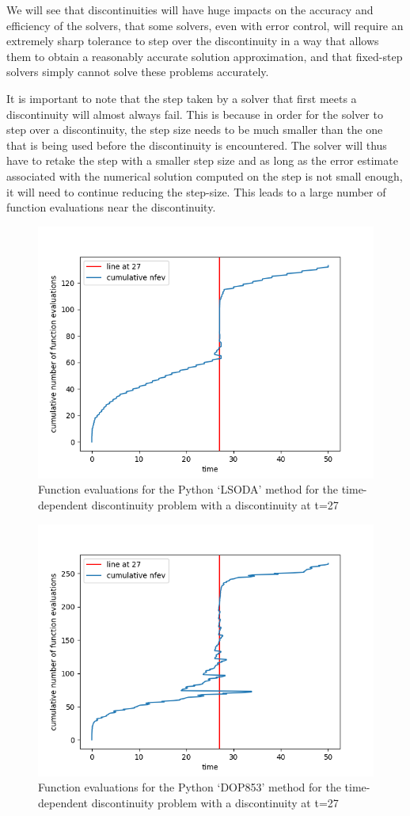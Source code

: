 We will see that discontinuities will have huge impacts on the accuracy and efficiency of the solvers, that some solvers, even with error control, will require an extremely sharp tolerance to step over the discontinuity in a way that allows them to obtain a reasonably accurate solution approximation, and that fixed-step solvers simply cannot solve these problems accurately. 

It is important to note that the step taken by a solver that first meets a discontinuity will almost always fail. This is because in order for the solver to step over a discontinuity, the step size needs to be much smaller than the one that is being used before the discontinuity is encountered. The solver will thus have to retake the step with a smaller step size and as long as the error estimate associated with the numerical solution computed on the step is not small enough, it will need to continue reducing the step-size. This leads to a large number of function evaluations near the discontinuity. 

\begin{figure}[h]
\centering
\includegraphics[width=0.7\linewidth]{./figures/lsoda_vs_discontinuity}
\caption{Function evaluations for the Python `LSODA' method for the time-dependent discontinuity problem with a discontinuity at t=27}
\label{fig:lsoda_vs_discontinuity}
\end{figure}

\begin{figure}[h]
\centering
\includegraphics[width=0.7\linewidth]{./figures/dop853_vs_discontinuity}
\caption{Function evaluations for the Python `DOP853' method for the time-dependent discontinuity problem with a discontinuity at t=27}
\label{fig:dop853_vs_discontinuity}
\end{figure}

